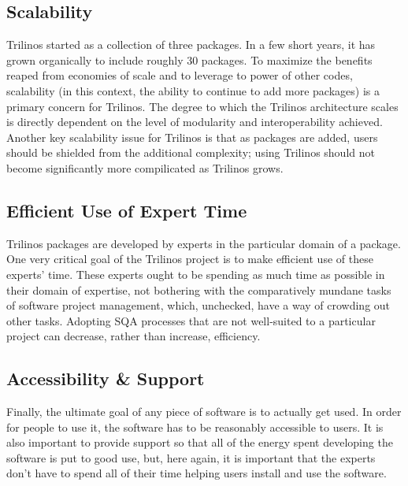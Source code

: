 \documentclass[12pt,relax]{article}
\begin{document}
\subsection{Scalability}
Trilinos started as a collection of three packages.  In a few short years, it
has grown organically to include roughly 30 packages.  To maximize the
benefits reaped from economies of scale and to leverage to power of other
codes, scalability (in this context, the ability to continue to add more
packages) is a primary concern for Trilinos.  The degree to which the Trilinos
architecture scales is directly dependent on the level of modularity and
interoperability achieved.  Another key scalability issue for Trilinos is that
as packages are added, users should be shielded from the additional complexity;
using Trilinos should not become significantly more compilicated as Trilinos
grows.

\subsection{Efficient Use of Expert Time}
Trilinos packages are developed by experts in the particular domain of a
package.  One very critical goal of the Trilinos project is to make efficient
use of these experts' time.  These experts ought to be spending as much time as
possible in their domain of expertise, not bothering with the comparatively
mundane tasks of software project management, which, unchecked, have a way of
crowding out other tasks.  Adopting SQA processes that are not well-suited to a
particular project can decrease, rather than increase, efficiency.

\subsection{Accessibility \& Support}
Finally, the ultimate goal of any piece of software is to actually get used.  
In order for people to use it, the software has to be reasonably accessible to
users.  It is also important to provide support so that all of the energy spent
developing the software is put to good use, but, here again, it is important
that the experts don't have to spend all of their time helping users install
and use the software.

\clearpage

\end{document}
